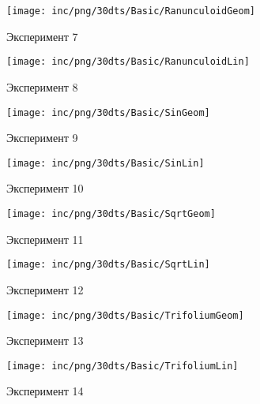 \begin{figure}  
	\begin{minipage}{0,5\textwidth}
		\texttt{[image: inc/png/30dts/Basic/RanunculoidGeom]}
		\label{fig:app1}
		\caption{Эксперимент 7}
	\end{minipage}
	\begin{minipage}{0,5\textwidth}
		\texttt{[image: inc/png/30dts/Basic/RanunculoidLin]}
		\label{fig:app2}
		\caption{Эксперимент 8}
	\end{minipage}
	
	\begin{minipage}{0,5\textwidth}
		\texttt{[image: inc/png/30dts/Basic/SinGeom]}
		\label{fig:app1}
		\caption{Эксперимент 9}
	\end{minipage}
	\begin{minipage}{0,5\textwidth}
		\texttt{[image: inc/png/30dts/Basic/SinLin]}
		\label{fig:app2}
		\caption{Эксперимент 10}
	\end{minipage}
	
	\begin{minipage}{0,5\textwidth}
		\texttt{[image: inc/png/30dts/Basic/SqrtGeom]}
		\label{fig:app1}
		\caption{Эксперимент 11}
	\end{minipage}
	\begin{minipage}{0,5\textwidth}
		\texttt{[image: inc/png/30dts/Basic/SqrtLin]}
		\label{fig:app2}
		\caption{Эксперимент 12}
	\end{minipage}
	
	\begin{minipage}{0,5\textwidth}
		\texttt{[image: inc/png/30dts/Basic/TrifoliumGeom]}
		\label{fig:app1}
		\caption{Эксперимент 13}
	\end{minipage}
	\begin{minipage}{0,5\textwidth}
		\texttt{[image: inc/png/30dts/Basic/TrifoliumLin]}
		\label{fig:app2}
		\caption{Эксперимент 14}
	\end{minipage}
\end{figure}
\clearpage

